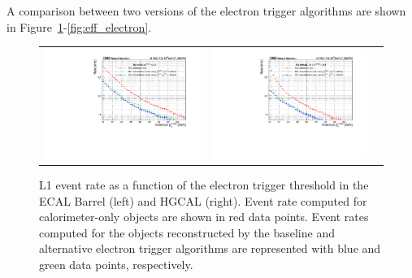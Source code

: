 A comparison between two versions of the electron trigger algorithms are shown in Figure~\ref{fig:rate_electron}-\ref{fig:eff_electron}. 

 \begin{figure}[tbh!]
 \begin{center}
  \begin{tabular}{ccc}
   \includegraphics[width=.45\linewidth]{figures/Part2/Upgrade/Rate_barrel}&
   \includegraphics[width=.45\linewidth]{figures/Part2/Upgrade/Rate_endcap}&
  \end{tabular}
  \caption{\ac{L1} event rate as a function of the electron trigger threshold in the \ac{ECAL} Barrel (left) and \ac{HGCAL} (right). Event rate computed for calorimeter-only objects are shown in red data points. Event rates computed for the objects reconstructed by the baseline and alternative electron trigger algorithms are represented with blue and green data points, respectively.}
 \label{fig:rate_electron}
 \end{center}
\end{figure}

